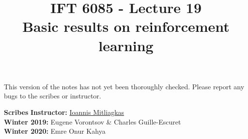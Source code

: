 \documentclass{article}
\title{IFT 6085 - Lecture 19 \\ 
Basic results on reinforcement learning}
\date{}
\begin{document}
 

\maketitle

\vspace{-0.5in}
\begin{center}
This version of the notes has not yet been thoroughly checked.
Please report any bugs to the scribes or instructor.
\end{center}
\vspace{0.2in}

\textbf{Scribes}\hfill
\textbf{Instructor:}  {\href{https://mitliagkas.github.io/}{Ioannis Mitliagkas}}\\
\textbf{Winter 2019:} Eugene Vorontsov \& Charles Guille-Escuret\\
\textbf{Winter 2020:} Emre Onur Kahya\\



\newcommand{\infgc}{\inf_{g \in \mathcal{C}}}
\newcommand{\supgc}{\sup_{g \in \mathcal{C}}}

\newcommand{\Prob}{\mathbb{P}}
\newcommand{\E}{\mathbb{E}}
\newcommand{\reals}{\mathbb{R}}



\end{document}
